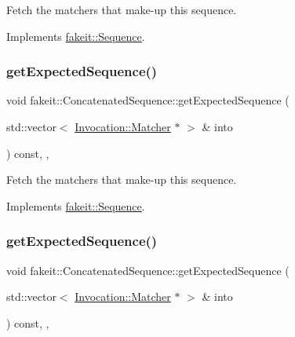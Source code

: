 Fetch the matchers that make-\/up this sequence. 



Implements \mbox{\hyperlink{classfakeit_1_1Sequence_aa1a1e4ad2fcac3379ba38f250bf06884}{fakeit\+::\+Sequence}}.

\mbox{\label{classfakeit_1_1ConcatenatedSequence_a176b1d4dac2e552f646c2c3ce98f0d1f}} 
\subsubsection{\texorpdfstring{getExpectedSequence()}{getExpectedSequence()}\hspace{0.1cm}{\footnotesize\ttfamily [7/9]}}
{\footnotesize\ttfamily void fakeit\+::\+Concatenated\+Sequence\+::get\+Expected\+Sequence (\begin{DoxyParamCaption}\item[{std\+::vector$<$ \mbox{\hyperlink{structfakeit_1_1Invocation_1_1Matcher}{Invocation\+::\+Matcher}} $\ast$ $>$ \&}]{into }\end{DoxyParamCaption}) const\hspace{0.3cm}{\ttfamily [inline]}, {\ttfamily [override]}, {\ttfamily [virtual]}}



Fetch the matchers that make-\/up this sequence. 



Implements \mbox{\hyperlink{classfakeit_1_1Sequence_aa1a1e4ad2fcac3379ba38f250bf06884}{fakeit\+::\+Sequence}}.

\mbox{\label{classfakeit_1_1ConcatenatedSequence_a176b1d4dac2e552f646c2c3ce98f0d1f}} 
\subsubsection{\texorpdfstring{getExpectedSequence()}{getExpectedSequence()}\hspace{0.1cm}{\footnotesize\ttfamily [8/9]}}
{\footnotesize\ttfamily void fakeit\+::\+Concatenated\+Sequence\+::get\+Expected\+Sequence (\begin{DoxyParamCaption}\item[{std\+::vector$<$ \mbox{\hyperlink{structfakeit_1_1Invocation_1_1Matcher}{Invocation\+::\+Matcher}} $\ast$ $>$ \&}]{into }\end{DoxyParamCaption}) const\hspace{0.3cm}{\ttfamily [inline]}, {\ttfamily [override]}, {\ttfamily [virtual]}}



